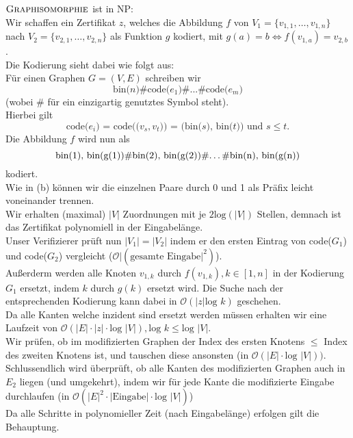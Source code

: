 \begin{enumerate}[(a)]
	$\textsc{Graphisomorphie}$ ist in NP:\\
	Wir schaffen ein Zertifikat $z$, welches die Abbildung $f$ von $V_1 = \{ v_{1,1}, \dots, v_{1,n} \}$ nach $V_2 = \{ v_{2,1}, \dots, v_{2,n} \}$ als Funktion $g$ kodiert, mit $g(a)=b \Leftrightarrow f(v_{1,a})=v_{2,b}$.\\
	Die Kodierung sieht dabei wie folgt aus:\\
	Für einen Graphen $G=(V,E)$ schreiben wir $$\text{bin($n$)\#code($e_1$)\#...\#code($e_m$)}$$ (wobei \# für ein einzigartig genutztes Symbol steht).\\
	Hierbei gilt $$\text{code($e_i$) = code(($v_s, v_t$)) = (bin($s$), bin($t$)) und $s \leq t$}.$$
	Die Abbildung $f$ wird nun als $$\text{bin(1), bin(g(1))\#bin(2), bin(g(2))\#\dots\#bin(n), bin(g(n))}$$
	kodiert.\\
	Wie in (b) können wir die einzelnen Paare durch 0 und 1 als Präfix leicht voneinander trennen. \\
	Wir erhalten (maximal) $|V|$ Zuordnungen mit je $2\text{log}(|V|)$ Stellen, demnach ist das Zertifikat polynomiell in der Eingabelänge.\\
	Unser Verifizierer prüft nun $|V_1|=|V_2|$ indem er den ersten Eintrag von code($G_1$) und code($G_2$) vergleicht ($\mathcal{O}|(\text{gesamte Eingabe}|^2)$).\\
	Außerderm werden alle Knoten $v_{1,k}$ durch $f(v_{1,k}), k \in [1,n]$ in der Kodierung $G_1$ ersetzt, indem $k$ durch $g(k)$ ersetzt wird. Die Suche nach der entsprechenden Kodierung kann dabei in $\mathcal{O}(|z|\text{log } k)$ geschehen.\\
	Da alle Kanten welche inzident sind ersetzt werden müssen erhalten wir eine Laufzeit von $\mathcal{O}(|E|\cdot|z|\cdot\text{log }|V|), \text{log }k \leq \text{log }|V|$.\\
	Wir prüfen, ob im modifizierten Graphen der Index des ersten Knotens $\leq$ Index des zweiten Knotens ist, und tauschen diese ansonsten (in $\mathcal{O}(|E|\cdot \text{log } |V|))$.\\
	Schlussendlich wird überprüft, ob alle Kanten des modifizierten Graphen auch in $E_2$ liegen (und umgekehrt), indem wir für jede Kante die modifizierte Eingabe durchlaufen (in $\mathcal{O}(|E|^2\cdot| \text{Eingabe}|\cdot \text{log }|V|)$)\\
	Da alle Schritte in polynomieller Zeit (nach Eingabelänge) erfolgen gilt die Behauptung.
	
	
	
\end{enumerate}
